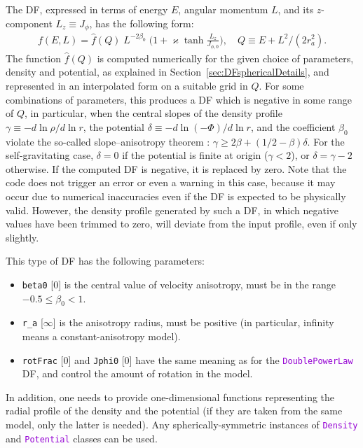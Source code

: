 \documentclass[12pt]{article}
\newcommand{\ttt}[1]{\textcolor{darkviolet}{\texttt{#1}}}
\newcommand{\ppp}[1]{\textcolor{darkolive} {\texttt{#1}}}
\begin{document}
The DF, expressed in terms of energy $E$, angular momentum $L$, and its $z$-component $L_z\equiv J_\phi$, has the following form:
\begin{align*}
f(E,L) = \hat f(Q) \; L^{-2\beta_0}\; \bigg(1 + \varkappa\tanh \frac{L_z}{J_{\phi,0}} \bigg), \quad
Q\equiv E + L^2 / (2 r_a^2) .
\end{align*}
The function $\hat f(Q)$ is computed numerically for the given choice of parameters, density and potential, as explained in Section~\ref{sec:DFsphericalDetails}, and represented in an interpolated form on a suitable grid in $Q$.
For some combinations of parameters, this produces a DF which is negative in some range of $Q$, in particular, when the central slopes of the density profile $\gamma \equiv -d\ln\rho/d\ln r$, the potential $\delta \equiv -d\ln(-\Phi)/d\ln r$, and the coefficient $\beta_0$ violate the so-called slope--anisotropy theorem \cite{AnEvans2006}: $\gamma \ge 2\beta + (1/2-\beta)\delta$. For the self-gravitating case, $\delta=0$ if the potential is finite at origin ($\gamma<2$), or $\delta=\gamma-2$ otherwise. If the computed DF is negative, it is replaced by zero. Note that the code does not trigger an error or even a warning in this case, because it may occur due to numerical inaccuracies even if the DF is expected to be physically valid. However, the density profile generated by such a DF, in which negative values have been trimmed to zero, will deviate from the input profile, even if only slightly.

This type of DF has the following parameters:
\begin{itemize}
\item \ppp{beta0} [0]  is the central value of velocity anisotropy, must be in the range $-0.5 \le \beta_0 < 1$.
\item \ppp{r_a} [$\infty$]  is the anisotropy radius, must be positive (in particular, infinity means a constant-anisotropy model).
\item \ppp{rotFrac} [0] and \ppp{Jphi0} [0] have the same meaning as for the \ttt{DoublePowerLaw} DF, and control the amount of rotation in the model.
\end{itemize}
In addition, one needs to provide one-dimensional functions representing the radial profile of the density and the potential (if they are taken from the same model, only the latter is needed). Any spherically-symmetric instances of \ttt{Density} and \ttt{Potential} classes can be used.
\end{document}
